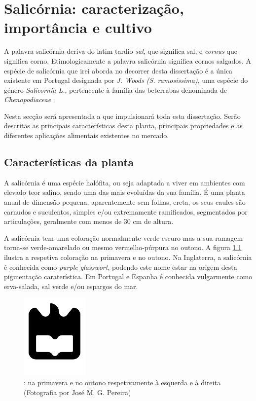 
\chapter{Salicórnia: caracterização, importância e cultivo}

A palavra salicórnia deriva do latim tardio \textit{sal}, que significa sal, e \textit{cornus} que significa corno. Etimologicamente a palavra salicórnia significa cornos salgados\cite{chambers}. A espécie de salicórnia que irei aborda no decorrer desta dissertação é a única existente em Portugal designada por \sr \textit{J. Woods (S. ramosissima)}\cite{JoaoSilva}, uma espécie do género \textit{Salicornia L.}, pertencente à família das beterrabas denominada de \textit{Chenopodiaceae} \cite{chenopodiaceae}.

Nesta secção será apresentada a \sr que impulsionará toda esta dissertação. Serão descritas as principais características desta planta, principais propriedades e as diferentes aplicações alimentais existentes no mercado. 

\section{Características da planta}


A salicórnia é uma espécie halófita, ou seja adaptada a viver em ambientes com elevado teor salino\cite{ferri}, sendo uma das mais evoluídas da sua família. É uma planta anual de dimensão pequena, aparentemente sem folhas, ereta, os seus caules são carnudos e suculentos, simples e/ou extremamente ramificados, segmentados por articulações\cite{Silva2000}, geralmente com menos de 30 cm de altura\cite{overviewsal}.

A salicórnia tem uma coloração normalmente verde-escuro mas a sua ramagem torna-se  verde-amarelado ou mesmo vermelho-púrpura no outono\cite{Silva2000}. A figura \ref{primoutono} ilustra a respetiva coloração na primavera e no outono. Na Inglaterra, a salicórnia é conhecida como \textit{purple glasswort}, podendo este nome estar na origem desta pigmentação caraterística\cite{Davy2001}. Em Portugal e Espanha é conhecida vulgarmente como erva-salada, sal verde e/ou espargos do mar\cite{RaquelPinto}. 

\newpage
\begin{figure}[!htb]
	\centering
	\includegraphics{uaLogoNew.pdf}
	\caption{\sr: na primavera e no outono respetivamente à esquerda e à direita (Fotografia por José M. G. Pereira)}
	\label{primoutono}
\end{figure}



